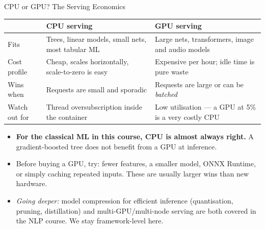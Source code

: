 \begin{frame}{CPU or GPU? The Serving Economics}

    \centering
    \renewcommand{\arraystretch}{1.3}
    {\scriptsize
    \begin{tabular}{p{3.4cm}|p{4.2cm}|p{4.2cm}}
        \toprule
                          & \textbf{CPU serving} & \textbf{GPU serving} \\
        \midrule
        Fits              & Trees, linear models, small nets, most tabular ML & Large nets, transformers,
                            image and audio models \\
        Cost profile      & Cheap, scales horizontally, scale-to-zero is easy & Expensive per hour;
                            idle time is pure waste \\
        Wins when         & Requests are small and sporadic & Requests are large or can be \emph{batched} \\
        Watch out for     & Thread oversubscription inside the container & Low utilisation --- a GPU at 5\%
                            is a very costly CPU \\
        \bottomrule
    \end{tabular}}

    \vspace{0.27em}
    \begin{itemize}
        \item \textbf{For the classical ML in this course, CPU is almost always right.} A gradient-boosted
              tree does not benefit from a GPU at inference.
        \item Before buying a GPU, try: fewer features, a smaller model, ONNX Runtime, or simply caching
              repeated inputs. These are usually larger wins than new hardware.
        \item \textit{Going deeper:} model compression for efficient inference (quantisation, pruning,
              distillation) and multi-GPU/multi-node serving are both covered in the NLP course. We stay
              framework-level here.
    \end{itemize}

\end{frame}

